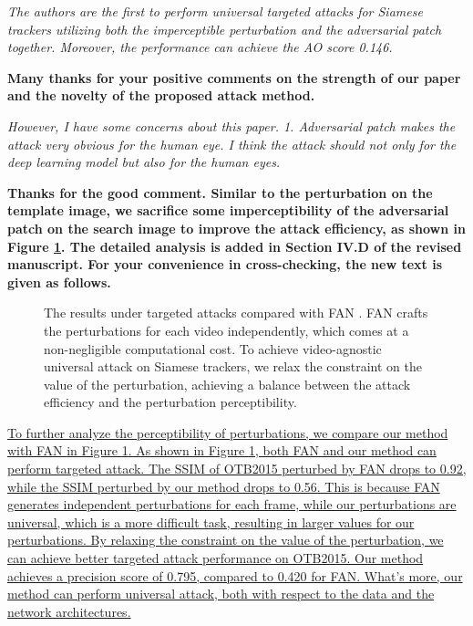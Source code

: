 \documentclass[12pt]{article}
\begin{document}
\newpage
\textit{The authors are the first to perform universal targeted attacks for Siamese trackers utilizing both the imperceptible perturbation and the adversarial patch together. Moreover, the performance can achieve the AO score 0.146.}

\textbf{Many thanks for your positive comments on the strength of our paper and the novelty of the proposed attack method.}

\textit{However, I have some concerns about this paper. 1. Adversarial patch makes the attack very obvious for the human eye. I think the attack should not only for the deep learning model but also for the human eyes.}

\textbf{
Thanks for the good comment. Similar to the perturbation on the template image, we sacrifice some imperceptibility of the adversarial patch on the search image to improve the attack efficiency, as shown in Figure \ref{fig:vis}. 
The detailed analysis is added in Section IV.D of the revised manuscript. For your convenience in cross-checking, the new text is given as follows.
}

\begin{figure}[h]
    \renewcommand\thefigure{7}
    \centering
    \caption{The results under targeted attacks compared with FAN \cite{FAN}.  FAN crafts the perturbations for each video independently, which comes at a non-negligible computational cost. To achieve video-agnostic universal attack on Siamese trackers, we relax the constraint on the value of the perturbation, achieving a balance between the attack efficiency and the perturbation perceptibility.}
    \label{fig:vis}
\end{figure}

\uline{
To further analyze the perceptibility of perturbations, we compare our method with FAN \cite{FAN} in Figure \ref{fig:vis}.
As shown in Figure \ref{fig:vis}, both FAN and our method can perform targeted attack. 
The SSIM of OTB2015 perturbed by FAN drops to 0.92, while the SSIM perturbed by our method drops to 0.56.
This is because FAN generates independent perturbations for each frame, while our perturbations are universal, which is a more difficult task, resulting in larger values for our perturbations.
By relaxing the constraint on the value of the perturbation, we can achieve better targeted attack performance on OTB2015.
Our method achieves a precision score of 0.795, compared to 0.420 for FAN.
What's more, our method can perform universal attack, both with respect to the data and the network architectures.}
\end{document}
